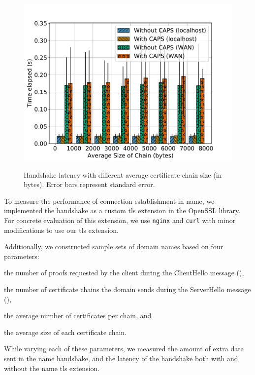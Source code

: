 \begin{figure}[t]
  \centering
  \includegraphics[width=\linewidth]{fig/eval_tls_ext/3-time_elapsed_vs_avg_chain_size}
  \label{fig:evaltlsext:sizechain}
  \caption{Handshake latency with different average certificate chain size (in
  bytes). Error bars represent standard error.}
  \label{fig:evaltlsext}
\end{figure}

To measure the performance of connection establishment in \ac{name}, we
implemented the handshake as a custom \ac{tls} extension in the OpenSSL library.
For concrete evaluation of this extension, we use \texttt{nginx} and \texttt{curl} with minor
modifications to use our \ac{tls} extension.

Additionally, we constructed sample sets of domain names based on four parameters:
\begin{inparaenum}
\item the number of proofs requested by the client during the
  ClientHello message (\numlas),
\item the number of certificate chains the domain sends during the ServerHello
  message (\policy),
\item the average number of certificates per chain, and
\item the average size of each certificate chain.
\end{inparaenum}
While varying each of these parameters, we measured the amount of extra data
sent in the \ac{name} handshake, and the latency of the handshake both with and
without the \ac{name} \ac{tls} extension.

